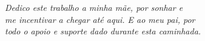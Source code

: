 \begin{dedicatoria}
   \vspace*{\fill}
   \centering
   \noindent
   \textit{Dedico este trabalho a minha mãe, por sonhar e \\
    me incentivar a chegar até aqui. E ao meu pai, por \\
    todo o apoio e suporte dado durante esta caminhada.} \vspace*{\fill}
\end{dedicatoria}
